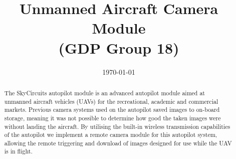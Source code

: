 \documentclass[oneside]{ecsgdp}         %
\begin{document}
\frontmatter
\title      {Unmanned Aircraft Camera Module \\(GDP Group 18)}
\date       {\today}
\subject    {ELEC6050 Group Design Project}
\maketitle
\begin{abstract}
The SkyCircuits autopilot module is an advanced autopilot module aimed at unmanned aircraft vehicles (UAVs) for the recreational, academic and commercial markets. Previous camera systems used on the autopilot saved images to on-board storage, meaning it was not possible to determine how good the taken images were without landing the aircraft. By utilising the built-in wireless transmission capabilities of the autopilot we implement a remote camera module for this autopilot system, allowing the remote triggering and download of images designed for use while the UAV is in flight.

\end{abstract}
\tableofcontents
\listoffigures
\listoftables
\lstlistoflistings
{}
\mainmatter



\newpage

\newpage

\newpage

\newpage

\newpage
%

\newpage

\newpage

\newpage

\newpage

\newpage

\newpage

\newpage

\newpage
\end{document}
